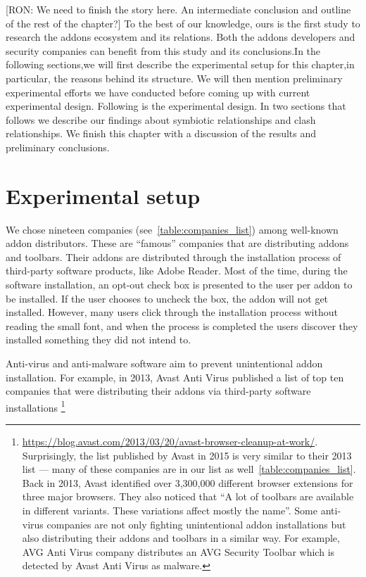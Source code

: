 \documentclass[11pt,oneside]{book}
\let\Oldsection\section
\renewcommand{\section}{\FloatBarrier\Oldsection}
\begin{document}
{[RON: We need to finish the story here. An intermediate conclusion and outline of the rest of the chapter?]
To the best of our knowledge, ours is the first study to research the addons ecosystem and its relations. Both the addons developers and security companies can benefit from this study and its conclusions.In the following sections,we will first describe the experimental setup for this chapter,in particular, the reasons behind its structure. We will then mention preliminary experimental efforts we have conducted before coming up with current experimental design. Following is the experimental design. In two sections that follows we describe our findings about symbiotic relationships and clash relationships. We finish this chapter with a discussion of the results and preliminary conclusions.

\section{Experimental setup}
We chose nineteen companies (see~\autoref{table:companies_list}) among well-known addon distributors. These are ``famous'' companies that are distributing addons and toolbars. Their addons are distributed through the installation process of third-party software products, like Adobe Reader. Most of the time, during the software installation, an opt-out check box is presented to the user per addon to be installed. If the user chooses to uncheck the box, the addon will not get installed. However, many users click through the installation process without reading the small font, and when the process is completed the users discover they installed something they did not intend to. 

Anti-virus and anti-malware software aim to prevent unintentional addon installation. For example, in 2013, Avast Anti Virus published a list of top ten companies that were distributing their addons via third-party software installations \footnote{\url{https://blog.avast.com/2013/03/20/avast-browser-cleanup-at-work/}. Surprisingly, the list published by Avast in 2015 is very similar to their 2013 list --- many of these companies are in our list as well~\autoref{table:companies_list}. Back in 2013, Avast identified over 3,300,000 different browser extensions for three major browsers. They also noticed that ``A lot of toolbars are available in different variants. These variations affect mostly the name''. Some anti-virus companies are not only fighting unintentional addon installations but also distributing their addons and toolbars in a similar way. For example, AVG Anti Virus company distributes an AVG Security Toolbar which is detected by Avast Anti Virus as malware. 

}}
\end{document}
